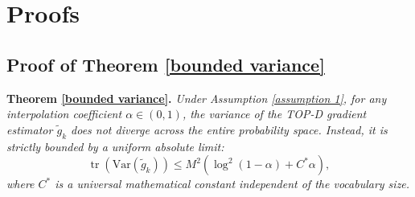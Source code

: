 \documentclass{article}
\theoremstyle{plain}
\theoremstyle{definition}
\theoremstyle{remark}
\begin{document}
\newpage
\section{Proofs}

\subsection{Proof of Theorem \ref{bounded variance}} \label{proof of bounded variance}
\textbf{Theorem \ref{bounded variance}.} \textit{
	Under Assumption \ref{assumption 1}, for any interpolation coefficient $\alpha\in(0,1)$, the variance of the TOP-D gradient estimator $\tilde{g}_k$ does not diverge across the entire probability space. Instead, it is strictly bounded by a uniform absolute limit:
	\begin{equation}
		\operatorname{tr}(\mathrm{Var}(\tilde{g}_k))\leq M^2\left(\log^2(1-\alpha)+C^*\alpha\right),
	\end{equation}
	where $C^*$ is a universal mathematical constant independent of the vocabulary size.
}
\end{document}
